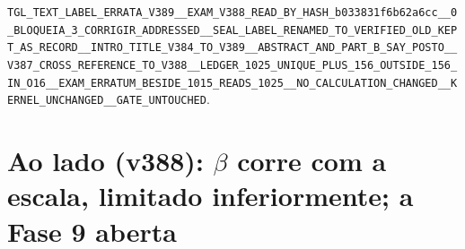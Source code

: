 \documentclass[11pt]{article}
\theoremstyle{definition}\newtheorem{deriv}{Derivação}
\begin{document}
\texttt{TGL\_\allowbreak{}TEXT\_\allowbreak{}LABEL\_\allowbreak{}ERRATA\_\allowbreak{}V389\_\allowbreak{}\_\allowbreak{}EXAM\_\allowbreak{}V388\_\allowbreak{}READ\_\allowbreak{}BY\_\allowbreak{}HASH\_\allowbreak{}b033831f6b62a6cc\_\allowbreak{}\_\allowbreak{}0\_\allowbreak{}BLOQUEIA\_\allowbreak{}3\_\allowbreak{}CORRIGIR\_\allowbreak{}ADDRESSED\_\allowbreak{}\_\allowbreak{}SEAL\_\allowbreak{}LABEL\_\allowbreak{}RENAMED\_\allowbreak{}TO\_\allowbreak{}VERIFIED\_\allowbreak{}OLD\_\allowbreak{}KEPT\_\allowbreak{}AS\_\allowbreak{}RECORD\_\allowbreak{}\_\allowbreak{}INTRO\_\allowbreak{}TITLE\_\allowbreak{}V384\_\allowbreak{}TO\_\allowbreak{}V389\_\allowbreak{}\_\allowbreak{}ABSTRACT\_\allowbreak{}AND\_\allowbreak{}PART\_\allowbreak{}B\_\allowbreak{}SAY\_\allowbreak{}POSTO\_\allowbreak{}\_\allowbreak{}V387\_\allowbreak{}CROSS\_\allowbreak{}REFERENCE\_\allowbreak{}TO\_\allowbreak{}V388\_\allowbreak{}\_\allowbreak{}LEDGER\_\allowbreak{}1025\_\allowbreak{}UNIQUE\_\allowbreak{}PLUS\_\allowbreak{}156\_\allowbreak{}OUTSIDE\_\allowbreak{}156\_\allowbreak{}IN\_\allowbreak{}O16\_\allowbreak{}\_\allowbreak{}EXAM\_\allowbreak{}ERRATUM\_\allowbreak{}BESIDE\_\allowbreak{}1015\_\allowbreak{}READS\_\allowbreak{}1025\_\allowbreak{}\_\allowbreak{}NO\_\allowbreak{}CALCULATION\_\allowbreak{}CHANGED\_\allowbreak{}\_\allowbreak{}KERNEL\_\allowbreak{}UNCHANGED\_\allowbreak{}\_\allowbreak{}GATE\_\allowbreak{}UNTOUCHED}.

\section*{Ao lado (v388): $\beta$ corre com a escala, limitado inferiormente; a Fase 9 aberta}

\end{document}
